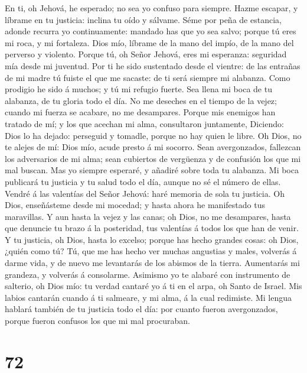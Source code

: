 En ti, oh Jehová, he esperado; no sea yo confuso para
siempre.  Hazme escapar, y líbrame en tu justicia: inclina
tu oído y sálvame.  Séme por peña de estancia, adonde
recurra yo continuamente: mandado has que yo sea salvo; porque tú eres
mi roca, y mi fortaleza.  Dios mío, líbrame de la mano del
impío, de la mano del perverso y violento.  Porque tú, oh
Señor Jehová, eres mi esperanza: seguridad mía desde mi juventud.
 Por ti he sido sustentado desde el vientre: de las entrañas
de mi madre tú fuiste el que me sacaste: de ti será siempre mi alabanza.
 Como prodigio he sido á muchos; y tú mi refugio fuerte.
 Sea llena mi boca de tu alabanza, de tu gloria todo el día.
 No me deseches en el tiempo de la vejez; cuando mi fuerza
se acabare, no me desampares.  Porque mis enemigos han
tratado de mí; y los que acechan mi alma, consultaron juntamente,
 Diciendo: Dios lo ha dejado: perseguid y tomadle, porque
no hay quien le libre.  Oh Dios, no te alejes de mí: Dios
mío, acude presto á mi socorro.  Sean avergonzados,
fallezcan los adversarios de mi alma; sean cubiertos de vergüenza y de
confusión los que mi mal buscan.  Mas yo siempre esperaré,
y añadiré sobre toda tu alabanza.  Mi boca publicará tu
justicia y tu salud todo el día, aunque no sé el número de ellas.
 Vendré á las valentías del Señor Jehová: haré memoria de
sola tu justicia.  Oh Dios, enseñásteme desde mi mocedad; y
hasta ahora he manifestado tus maravillas.  Y aun hasta la
vejez y las canas; oh Dios, no me desampares, hasta que denuncie tu
brazo á la posteridad, tus valentías á todos los que han de venir.
 Y tu justicia, oh Dios, hasta lo excelso; porque has hecho
grandes cosas: oh Dios, ¿quién como tú?  Tú, que me has
hecho ver muchas angustias y males, volverás á darme vida, y de nuevo me
levantarás de los abismos de la tierra.  Aumentarás mi
grandeza, y volverás á consolarme.  Asimismo yo te alabaré
con instrumento de salterio, oh Dios mío: tu verdad cantaré yo á ti en
el arpa, oh Santo de Israel.  Mis labios cantarán cuando á
ti salmeare, y mi alma, á la cual redimiste.  Mi lengua
hablará también de tu justicia todo el día: por cuanto fueron
avergonzados, porque fueron confusos los que mi mal procuraban.

\hypertarget{section-71}{%
\section{72}\label{section-71}}

